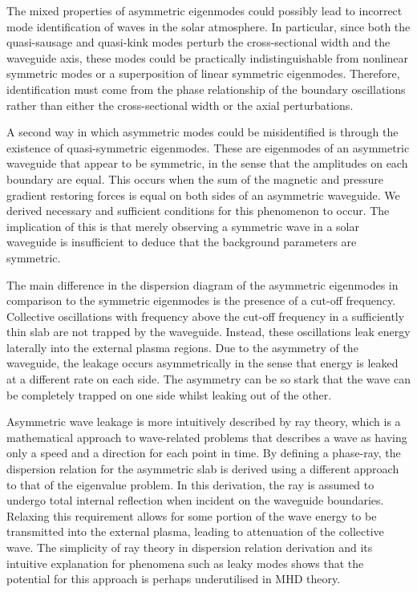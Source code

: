 \documentclass[12pt]{../style-files/ociamthesis}
\begin{document}
The mixed properties of asymmetric eigenmodes could possibly lead to incorrect mode identification of waves in the solar atmosphere. In particular, since both the quasi-sausage and quasi-kink modes perturb the cross-sectional width and the waveguide axis, these modes could be practically indistinguishable from nonlinear symmetric modes or a superposition of linear symmetric eigenmodes. Therefore, identification must come from the phase relationship of the boundary oscillations rather than either the cross-sectional width or the axial perturbations.

A second way in which asymmetric modes could be misidentified is through the existence of quasi-symmetric eigenmodes. These are eigenmodes of an asymmetric waveguide that appear to be symmetric, in the sense that the amplitudes on each boundary are equal. This occurs when the sum of the magnetic and pressure gradient restoring forces is equal on both sides of an asymmetric waveguide. We derived necessary and sufficient conditions for this phenomenon to occur. The implication of this is that merely observing a symmetric wave in a solar waveguide is insufficient to deduce that the background parameters are symmetric.

The main difference in the dispersion diagram of the asymmetric eigenmodes in comparison to the symmetric eigenmodes is the presence of a cut-off frequency. Collective oscillations with frequency above the cut-off frequency in a sufficiently thin slab are not trapped by the waveguide. Instead, these oscillations leak energy laterally into the external plasma regions. Due to the asymmetry of the waveguide, the leakage occurs asymmetrically in the sense that energy is leaked at a different rate on each side. The asymmetry can be so stark that the wave can be completely trapped on one side whilst leaking out of the other.

Asymmetric wave leakage is more intuitively described by ray theory, which is a mathematical approach to wave-related problems that describes a wave as having only a speed and a direction for each point in time. By defining a phase-ray, the dispersion relation for the asymmetric slab is derived using a different approach to that of the eigenvalue problem. In this derivation, the ray is assumed to undergo total internal reflection when incident on the waveguide boundaries. Relaxing this requirement allows for some portion of the wave energy to be transmitted into the external plasma, leading to attenuation of the collective wave. The simplicity of ray theory in dispersion relation derivation and its intuitive explanation for phenomena such as leaky modes shows that the potential for this approach is perhaps underutilised in MHD theory.
\end{document}

